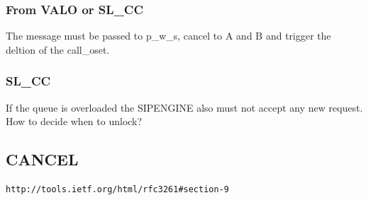 \documentclass[a4paper]{article}
\begin{document}
\subsubsection{From VALO or SL\_CC}

The message must be passed to p\_w\_s, cancel to A and B and trigger the deltion of the call\_oset.

\subsubsection{SL\_CC}
If the queue is overloaded the SIPENGINE also must not accept any new request.
How to decide when to unlock?





\subsection{CANCEL}
\begin{verbatim}
http://tools.ietf.org/html/rfc3261#section-9
\end{verbatim}
\end{document}
